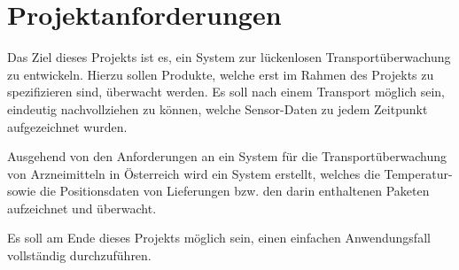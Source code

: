 \section{Projektanforderungen}
\label{sec:requirements}

Das Ziel dieses Projekts ist es, ein System zur lückenlosen Transportüberwachung
	zu entwickeln. Hierzu sollen Produkte, welche erst im Rahmen des Projekts zu
	spezifizieren sind, überwacht werden. Es soll nach einem Transport möglich
	sein, eindeutig nachvollziehen zu können, welche Sensor-Daten zu jedem
	Zeitpunkt aufgezeichnet wurden.

Ausgehend von den Anforderungen an ein System für die Transportüberwachung von
	Arzneimitteln in Österreich \cite{PHARMIG07} wird ein System erstellt,
	welches die Temperatur- sowie die Positionsdaten von Lieferungen bzw.
	den darin enthaltenen Paketen aufzeichnet und überwacht.
	
Es soll am Ende dieses Projekts möglich sein, einen einfachen Anwendungsfall
	vollständig	durchzuführen.